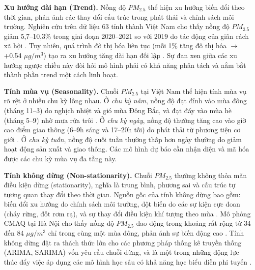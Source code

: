 \textbf{Xu hướng dài hạn (Trend).} Nồng độ $PM_{2.5}$ thể hiện xu hướng biến đổi theo thời gian, phản ánh các thay đổi cấu trúc trong phát thải và chính sách môi trường. Nghiên cứu trên dữ liệu 63 tỉnh thành Việt Nam cho thấy nồng độ $PM_{2.5}$ giảm 5,7--10,3\% trong giai đoạn 2020--2021 so với 2019 do tác động của giãn cách xã hội \cite{hoang2023health}. Tuy nhiên, quá trình đô thị hóa liên tục (mỗi 1\% tăng đô thị hóa $\rightarrow$ +0,54 $\mu g/m^3$) tạo ra xu hướng tăng dài hạn đối lập \cite{bui2025urbanization}. Sự đan xen giữa các xu hướng ngược chiều này đòi hỏi mô hình phải có khả năng phân tách và nắm bắt thành phần trend một cách linh hoạt.

\textbf{Tính mùa vụ (Seasonality).} Chuỗi $PM_{2.5}$ tại Việt Nam thể hiện tính mùa vụ rõ rệt ở nhiều chu kỳ lồng nhau. Ở \textit{chu kỳ năm}, nồng độ đạt đỉnh vào mùa đông (tháng 11--3) do nghịch nhiệt và gió mùa Đông Bắc, và đạt đáy vào mùa hè (tháng 5--9) nhờ mưa rửa trôi \cite{dam2024pm25, ho2025assessment}. Ở \textit{chu kỳ ngày}, nồng độ thường tăng cao vào giờ cao điểm giao thông (6--9h sáng và 17--20h tối) do phát thải từ phương tiện cơ giới \cite{ho2025assessment}. Ở \textit{chu kỳ tuần}, nồng độ cuối tuần thường thấp hơn ngày thường do giảm hoạt động sản xuất và giao thông. Các mô hình dự báo cần nhận diện và mã hóa được các chu kỳ mùa vụ đa tầng này.

\textbf{Tính không dừng (Non-stationarity).} Chuỗi $PM_{2.5}$ thường không thỏa mãn điều kiện dừng (stationarity), nghĩa là trung bình, phương sai và cấu trúc tự tương quan thay đổi theo thời gian. Nguồn gốc của tính không dừng bao gồm: biến đổi xu hướng do chính sách môi trường, đột biến do các sự kiện cực đoan (cháy rừng, đốt rơm rạ), và sự thay đổi điều kiện khí tượng theo mùa \cite{dam2024pm25}. Mô phỏng CMAQ tại Hà Nội cho thấy nồng độ $PM_{2.5}$ dao động trong khoảng rất rộng từ 34 đến 84 $\mu g/m^3$ chỉ trong cùng một mùa đông, phản ánh sự biến động cao \cite{nguyen2024cmaq}. Tính không dừng đặt ra thách thức lớn cho các phương pháp thống kê truyền thống (ARIMA, SARIMA) vốn yêu cầu chuỗi dừng, và là một trong những động lực thúc đẩy việc áp dụng các mô hình học sâu có khả năng học biểu diễn phi tuyến \cite{silveira2025lstmgru}.


